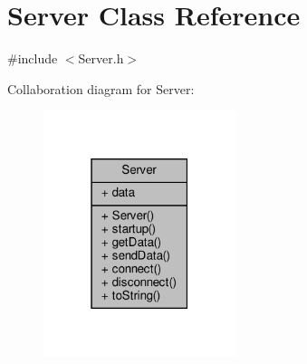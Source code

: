 \hypertarget{classServer}{}\section{Server Class Reference}
\label{classServer}


{\ttfamily \#include $<$Server.\+h$>$}



Collaboration diagram for Server\+:\nopagebreak
\begin{figure}[H]
\begin{center}
\leavevmode
\includegraphics[width=159pt]{classServer__coll__graph}
\end{center}
\end{figure}
